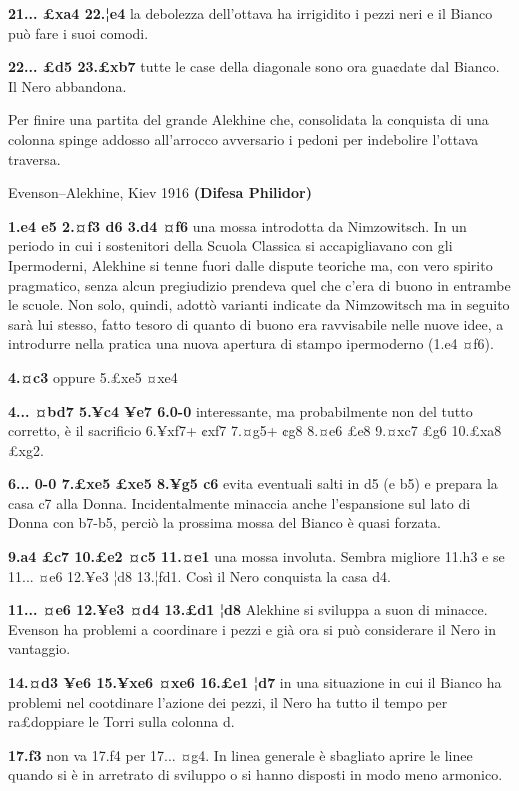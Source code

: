 \documentclass[
]{article}
\begin{document}
\textbf{21... £xa4 22.¦e4} la debolezza dell'ottava ha irrigidito i
pezzi neri e il Bianco può fare i suoi comodi.

\textbf{22... £d5 23.£xb7} tutte le case della diagonale sono ora
gua¢date dal Bianco. Il Nero abbandona.

Per finire una partita del grande Alekhine che, consolidata la conquista
di una colonna spinge addosso all'arrocco avversario i pedoni per
indebolire l'ottava traversa.

Evenson--Alekhine, Kiev 1916 \textbf{(Difesa Philidor)}

\textbf{1.e4 e5 2.¤f3 d6 3.d4 ¤f6} una mossa introdotta da Nimzowitsch.
In un periodo in cui i sostenitori della Scuola Classica si
accapigliavano con gli Ipermoderni, Alekhine si tenne fuori dalle
dispute teoriche ma, con vero spirito pragmatico, senza alcun
pregiudizio prendeva quel che c'era di buono in entrambe le scuole. Non
solo, quindi, adottò varianti indicate da Nimzowitsch ma in seguito sarà
lui stesso, fatto tesoro di quanto di buono era ravvisabile nelle nuove
idee, a introdurre nella pratica una nuova apertura di stampo
ipermoderno (1.e4 ¤f6).

\textbf{4.¤c3} oppure 5.£xe5 ¤xe4

\textbf{4... ¤bd7 5.¥c4 ¥e7 6.0-0} interessante, ma probabilmente non
del tutto corretto, è il sacrificio 6.¥xf7+ ¢xf7 7.¤g5+ ¢g8 8.¤e6 £e8
9.¤xc7 £g6 10.£xa8 £xg2.

\textbf{6... 0-0 7.£xe5 £xe5 8.¥g5 c6} evita eventuali salti in d5 (e
b5) e prepara la casa c7 alla Donna. Incidentalmente minaccia anche
l'espansione sul lato di Donna con b7-b5, perciò la prossima mossa del
Bianco è quasi forzata.

\textbf{9.a4 £c7 10.£e2 ¤c5 11.¤e1} una mossa involuta. Sembra migliore
11.h3 e se 11... ¤e6 12.¥e3 ¦d8 13.¦fd1. Così il Nero conquista la casa
d4.

\textbf{11... ¤e6 12.¥e3 ¤d4 13.£d1 ¦d8} Alekhine si sviluppa a suon di
minacce. Evenson ha problemi a coordinare i pezzi e già ora si può
considerare il Nero in vantaggio.

\textbf{14.¤d3 ¥e6 15.¥xe6 ¤xe6 16.£e1 ¦d7} in una situazione in cui il
Bianco ha problemi nel cootdinare l'azione dei pezzi, il Nero ha tutto
il tempo per ra£doppiare le Torri sulla colonna d.

\textbf{17.f3} non va 17.f4 per 17... ¤g4. In linea generale è sbagliato
aprire le linee quando si è in arretrato di sviluppo o si hanno disposti
in modo meno armonico.
\end{document}
